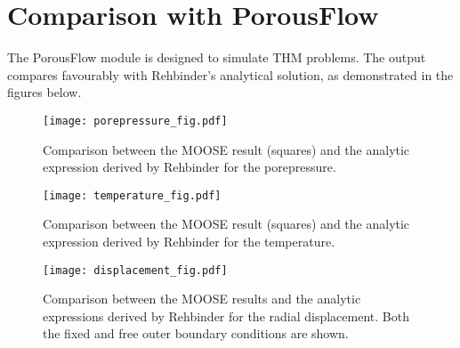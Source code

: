 \documentclass[]{scrreprt}
\begin{document}
\chapter{Comparison with PorousFlow}

The PorousFlow module is designed to simulate THM problems.  The
output compares favourably with Rehbinder's analytical solution, as
demonstrated in the figures below.

\begin{figure}[htb]
\centering
\texttt{[image: porepressure\_fig.pdf]}
\caption{Comparison between the MOOSE result (squares) and the
  analytic expression derived by Rehbinder for the porepressure.}
\label{porepressure_fig.fig}
\end{figure}

\begin{figure}[htb]
\centering
\texttt{[image: temperature\_fig.pdf]}
\caption{Comparison between the MOOSE result (squares) and the
  analytic expression derived by Rehbinder for the temperature.}
\label{temperature_fig.fig}
\end{figure}

\begin{figure}[htb]
\centering
\texttt{[image: displacement\_fig.pdf]}
\caption{Comparison between the MOOSE results and the
  analytic expressions derived by Rehbinder for the radial
  displacement.  Both the fixed and free outer boundary conditions are
  shown.}
\label{displacement_fig.fig}
\end{figure}
\end{document}
